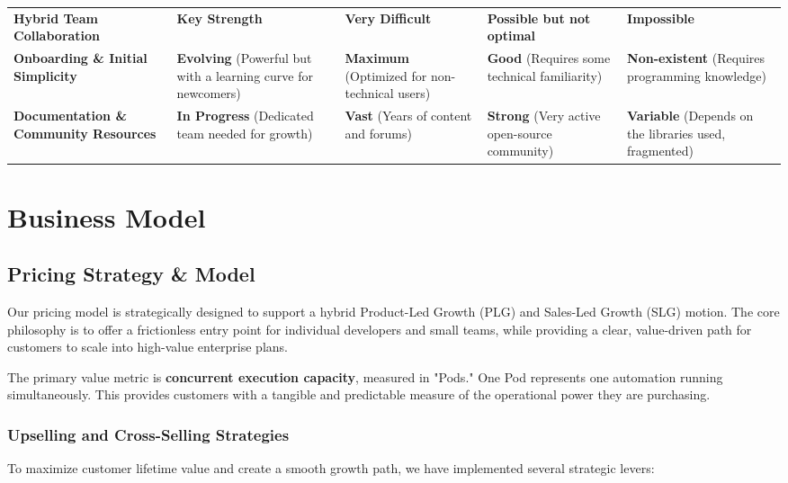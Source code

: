\begin{table}[H]
{\begin{tabularx}{1.2\textwidth}{lLLLL}
\addlinespace
\textbf{Hybrid Team Collaboration} & \textbf{Key Strength} & \textbf{Very Difficult} & \textbf{Possible but not optimal} & \textbf{Impossible} \\
\addlinespace
\textbf{Onboarding \& Initial Simplicity} & \textbf{Evolving} (Powerful but with a learning curve for newcomers) & \textbf{Maximum} (Optimized for non-technical users) & \textbf{Good} (Requires some technical familiarity) & \textbf{Non-existent} (Requires programming knowledge) \\
\addlinespace
\textbf{Documentation \& Community Resources} & \textbf{In Progress} (Dedicated team needed for growth) & \textbf{Vast} (Years of content and forums) & \textbf{Strong} (Very active open-source community) & \textbf{Variable} (Depends on the libraries used, fragmented) \\
\bottomrule
\end{tabularx}%
}
\end{table}

\section{Business Model}
\subsection{Pricing Strategy \& Model}
Our pricing model is strategically designed to support a hybrid Product-Led Growth (PLG) and Sales-Led Growth (SLG) motion. The core philosophy is to offer a frictionless entry point for individual developers and small teams, while providing a clear, value-driven path for customers to scale into high-value enterprise plans.

The primary value metric is \textbf{concurrent execution capacity}, measured in "Pods." One Pod represents one automation running simultaneously. This provides customers with a tangible and predictable measure of the operational power they are purchasing.

\subsubsection{Upselling and Cross-Selling Strategies}

To maximize customer lifetime value and create a smooth growth path, we have implemented several strategic levers:

